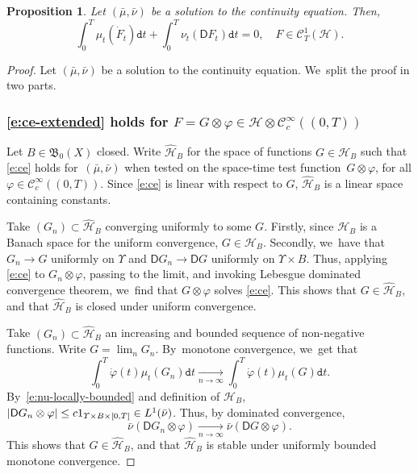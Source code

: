 \documentclass[JEP,XML,SOM,Unicode,published]{cedram}
\newtheorem{proposition}[theorem]{Proposition}
\theoremstyle{definition}
\theoremstyle{remark}
\DeclarePairedDelimiter{\abs}{\lvert}{\rvert}
\begin{document}
\begin{proposition}\label{t:ce-extended}
Let $(\bar{\mu}, \bar{\nu})$ be a solution to the continuity equation.
Then,
\begin{equation}\label{e:ce-extended}
\int_{0}^{T} \mu_{t}(\dot{F}_{t}) \mathtt{d} t + \int_{0}^{T} \nu_{t}(\mathsf{D} F_{t}) \mathtt{d} t = 0, \quad F \in \mathscr{C}^{1}_{T}(\mathscr{H}).
\end{equation}
\end{proposition}
\begin{proof}
Let $(\bar{\mu}, \bar{\nu})$ be a solution to the continuity equation. We~split the proof in two parts.
\subsubsection*{\cref{e:ce-extended} holds for $F = G \otimes \varphi \in \mathscr{H} \otimes \mathscr{C}_{c}^{\infty}((0,T))$}
Let $B \in \mathfrak{B}_{0}(X)$ closed.
Write $\hat{\mathscr{H}}_{B}$ for the space of functions $G \in \mathscr{H}_{B}$ such that \cref{e:ce} holds for~$(\bar\mu,\bar\nu)$ when tested on the space-time test function~$G \otimes \varphi$, for all $\varphi \in \mathscr{C}_{c}^{\infty}((0,T))$.
Since \cref{e:ce} is linear with respect to $G$, $\hat{\mathscr{H}}_{B}$ is a linear space containing constants.

Take $(G_{n}) \subset \hat{\mathscr{H}}_{B}$ converging uniformly to some $G$.
Firstly, since $\mathscr{H}_{B}$ is a Banach space for the uniform convergence, $G \in \mathscr{H}_{B}$.
Secondly, we~have that $G_{n} \to G$ uniformly on $\varUpsilon$ and $\mathsf{D} G_{n} \to \mathsf{D} G$ uniformly on $\varUpsilon \times B$.
Thus, applying \cref{e:ce} to $G_{n} \otimes \varphi$, passing to the limit, and invoking Lebesgue dominated convergence theorem, we~find that $G \otimes \varphi$ solves \cref{e:ce}.
This shows that $G \in \hat{\mathscr{H}}_{B}$, and that $\hat{\mathscr{H}}_{B}$ is closed under uniform convergence.

Take $(G_{n})\subset \hat{\mathscr{H}}_{B}$ an increasing and bounded sequence of non-negative functions.
Write $G = \lim_{n} G_{n}$.
By~monotone convergence, we~get that
\begin{equation*}
\int_{0}^{T} \dot{\varphi}(t) \mu_{t}(G_{n}) \mathtt{d} t \xrightarrow[n \to \infty]{} \int_{0}^{T} \dot{\varphi}(t) \mu_{t}(G) \mathtt{d} t.
\end{equation*}
By~\cref{e:nu-locally-bounded} and definition of $\mathscr{H}_{B}$, $\abs{\mathsf{D} G_{n} \otimes \varphi} \leq c 1_{\varUpsilon \times B \times [0,T]} \in L^{1}(\bar{\nu})$.
Thus, by dominated convergence,
\begin{equation*}
\bar{\nu}(\mathsf{D} G_{n} \otimes \varphi) \xrightarrow[n \to \infty]{} \bar{\nu}(\mathsf{D} G \otimes \varphi).
\end{equation*}
This shows that $G \in \hat{\mathscr{H}}_{B}$, and that $\hat{\mathscr{H}}_{B}$ is stable under uniformly bounded monotone convergence.


\end{proof}
\end{document}
